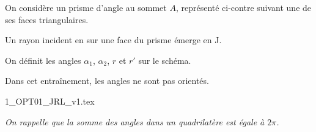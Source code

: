 	
	\initialisationPartieGauche %
	On considère un prisme d'angle au sommet $A$, représenté ci-contre suivant une de ses faces triangulaires.
	
	Un rayon incident en \ptI sur une face du prisme émerge en J. 
	
	On définit les angles $\alpha_1$, $\alpha_2$, $r$ et $r'$ sur le schéma.
	
	\smallskip
	
	Dans cet entraînement, les angles ne sont pas orientés.
	
	
	
	\initialisationPartieDroite %
	\begin{center}
		{1_OPT01_JRL_v1.tex}
	\end{center}
	\finalisationDuPartageDePage %
	
	
	\debutEntrainement

\medskip

{\itshape
On rappelle que la somme des angles dans un quadrilatère est égale à $2\pi$.} 

	
	
